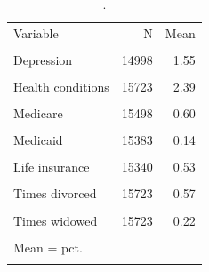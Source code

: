 \begin{table}[htbp]\centering\small
\caption{.}
\label{tab:demographics_other}
\begin{tabular}{lrr}\toprule
Variable & N & Mean \\\\ \midrule
Depression & 14998 & 1.55 \\\\
Health conditions & 15723 & 2.39 \\\\
Medicare & 15498 & 0.60 \\\\
Medicaid & 15383 & 0.14 \\\\
Life insurance & 15340 & 0.53 \\\\
Times divorced & 15723 & 0.57 \\\\
Times widowed & 15723 & 0.22 \\\\
\bottomrule
\multicolumn{3}{l}{\footnotesize Mean = pct.} \\\\
\end{tabular}\end{table}

